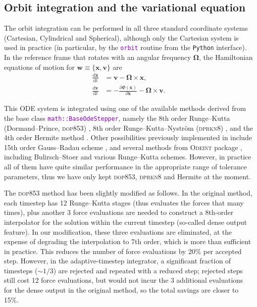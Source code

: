 \documentclass[12pt]{article}
\newcommand{\Python}{\texttt{Python}\xspace}
\newcommand{\ttt}[1]{\textcolor{darkviolet}{\texttt{#1}}}
\renewcommand{\d}{\mathrm{d}}
\newcommand{\bv}{\boldsymbol{v}}
\newcommand{\bx}{\boldsymbol{x}}
\begin{document}
\subsection{Orbit integration and the variational equation}  \label{sec:OrbitDetails}

The orbit integration can be performed in all three standard coordinate systems (Cartesian, Cylindrical and Spherical), although only the Cartesian system is used in practice (in particular, by the \ttt{orbit} routine from the \Python interface). In the reference frame that rotates with an angular frequency $\boldsymbol\Omega$, the Hamiltonian equations of motion for $\boldsymbol{w} \equiv \{\bx, \bv\}$ are
\begin{subequations}
\begin{align}
\frac{\d\bx}{\d t} &= \bv - \boldsymbol\Omega \times \bx, \\
\frac{\d\bv}{\d t} &= -\frac{\partial\Phi(\bx)}{\partial\bx} - \boldsymbol\Omega \times \bv.
\end{align}
\end{subequations}

This ODE system is integrated using one of the available methods derived from the base class \ttt{math::BaseOdeStepper}, namely the 8th order Runge--Kutta (Dormand--Prince, \textsc{dop853}) \cite{DOP853}, 8th order Runge--Kutta--Nystr\"om (\textsc{dprkn8}) \cite{DPRKN8}, and the 4th order Hermite method \cite{Hermite}. Other possibilities previously implemented in \cite{Vasiliev2013} include 15th order Gauss--Radau scheme \cite{IAS15}, and several methods from \textsc{Odeint} package \cite{odeint}, including Bulirsch--Stoer and various Runge--Kutta schemes. However, in practice all of them have quite similar performance in the appropriate range of tolerance parameters, thus we have only kept \textsc{dop853}, \textsc{dprkn8} and Hermite at the moment.

The \textsc{dop853} method has been slightly modified as follows. In the original method, each timestep has 12 Runge--Kutta stages (thus evaluates the forces that many times), plus another 3 force evaluations are needed to construct a 8th-order interpolator for the solution within the current timestep (so-called dense output feature). In our modification, these three evaluations are eliminated, at the expense of degrading the interpolation to 7th order, which is more than sufficient in practice. This reduces the number of force evaluations by 20\% per accepted step. However, in the adaptive-timestep integrator, a significant fraction of timesteps ($\sim1/3$) are rejected and repeated with a reduced step; rejected steps still cost 12 force evaluations, but would not incur the 3 additional evaluations for the dense output in the original method, so the total savings are closer to 15\%.
\end{document}

